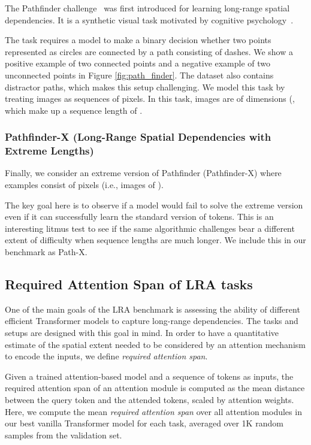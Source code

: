\documentclass{article} \usepackage{iclr2021_conference,times}
\begin{document}
    The Pathfinder challenge~\citep{linsley2018learning, Kim2020Disentangling} was first introduced for learning long-range spatial dependencies. It is a synthetic visual task motivated by cognitive psychology~\citep{houtkamp2010parallel}. 
    
    The task requires a model to make a binary decision whether two points represented as circles are connected by a path consisting of dashes. We show a positive example of two connected points and a negative example of two unconnected points in Figure \ref{fig:path_finder}. The dataset also contains distractor paths, which makes this setup challenging. We model this task by treating images as sequences of pixels. In this task, images are of dimensions (, which make up a sequence length of . 

    \subsubsection{Pathfinder-X (Long-Range Spatial Dependencies with Extreme Lengths)}
    Finally, we consider an extreme version of Pathfinder (Pathfinder-X) where examples consist of  pixels (i.e., images of ). 
    
    The key goal here is to observe if a model would fail to solve the  extreme version even if it can successfully learn the standard version of  tokens. This is an interesting litmus test to see if the same algorithmic challenges bear a different extent of difficulty when sequence lengths are much longer. We include this in our benchmark as Path-X.
    
\subsection{Required Attention Span of LRA tasks}
One of the main goals of the LRA benchmark is assessing the ability of different efficient Transformer models to capture long-range dependencies. The tasks and setups are designed with this goal in mind. In order to have a quantitative estimate of the spatial extent needed to be considered by an attention mechanism to encode the inputs, we define \emph{required attention span}. 

Given a trained attention-based model and a sequence of tokens as inputs, the required attention span of an attention module is computed as the mean distance between the query token and the attended tokens, scaled by attention weights. Here, we compute the mean \emph{required attention span} over all attention modules in our best vanilla Transformer model for each task, averaged over 1K random samples from the validation set. 
\end{document}
